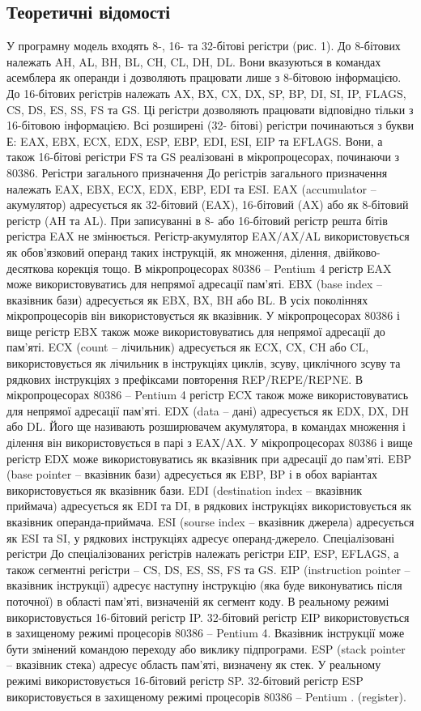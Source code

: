 \documentclass[12pt]{extarticle}
\begin{document}
\subsection*{Теоретичні відомості}
У програмну модель входять 8-, 16- та 32-бітові регістри (рис. 1). До 8-бітових
належать AH, AL, BH, BL, CH, CL, DH, DL. Вони вказуються в командах асемблера як
операнди і дозволяють працювати лише з 8-бітовою інформацією. До 16-бітових регістрів
належать AX, BX, CX, DX, SP, BP, DI, SI, IP, FLAGS, CS, DS, ES, SS, FS та GS. Ці регістри
дозволяють працювати відповідно тільки з 16-бітовою інформацією. Всі розширені (32-
бітові) регістри починаються з букви Е: EAX, EBX, ECX, EDX, ESP, EBP, EDI, ESI, EIP
та EFLAGS. Вони, а також 16-бітові регістри FS та GS реалізовані в мікропроцесорах,
починаючи з 80386.
Регістри загального призначення
До регістрів загального призначення належать EAX, EBX, ECX, EDX, EBP, EDI та
ESI.
EAX (accumulator – акумулятор) адресується як 32-бітовий (EAX), 16-бітовий
(AX) або як 8-бітовий регістр (AH та AL). При записуванні в 8- або 16-бітовий регістр
решта бітів регістра EAX не змінюється. Регістр-акумулятор EAX/AX/AL
використовується як обов’язковий операнд таких інструкцій, як множення, ділення,
двійково-десяткова корекція тощо. В мікропроцесорах 80386 – Pentium 4 регістр EAX
може використовуватись для непрямої адресації пам’яті.
EBX (base index – вказівник бази) адресується як EBX, BX, BH або BL. В усіх
поколіннях мікропроцесорів він використовується як вказівник. У мікропроцесорах 80386
і вище регістр EBX також може використовуватись для непрямої адресації до пам’яті.
ECX (count – лічильник) адресується як ECX, CX, CH або CL, використовується
як лічильник в інструкціях циклів, зсуву, циклічного зсуву та рядкових інструкціях з
префіксами повторення REP/REPE/REPNE. В мікропроцесорах 80386 – Pentium 4
регістр ECX також може використовуватись для непрямої адресації пам’яті.
EDX (data – дані) адресується як EDX, DX, DH або DL. Його ще називають
розширювачем акумулятора, в командах множення і ділення він використовується в
парі з EAX/AX. У мікропроцесорах 80386 і вище регістр EDX може використовуватись
як вказівник при адресації до пам’яті.
EBP (base pointer – вказівник бази) адресується як EBP, BP і в обох варіантах
використовується як вказівник бази.
EDI (destination index – вказівник приймача) адресується як EDI та DI, в рядкових
інструкціях використовується як вказівник операнда-приймача.
ESI (sourse index – вказівник джерела) адресується як ESI та SI, у рядкових
інструкціях адресує операнд-джерело.
Спеціалізовані регістри
До спеціалізованих регістрів належать регістри EIP, ESP, EFLAGS, а також
сегментні регістри – CS, DS, ES, SS, FS та GS.
EIP (instruction pointer – вказівник інструкції) адресує наступну інструкцію (яка
буде виконуватись після поточної) в області пам’яті, визначеній як сегмент коду. В
реальному режимі використовується 16-бітовий регістр IP. 32-бітовий регістр EIP
використовується в захищеному режимі процесорів 80386 – Pentium 4. Вказівник
інструкції може бути змінений командою переходу або виклику підпрограми.
ESP (stack pointer – вказівник стека) адресує область пам’яті, визначену як стек. У
реальному режимі використовується 16-бітовий регістр SP. 32-бітовий регістр ESP
використовується в захищеному режимі процесорів 80386 – Pentium .
(register).
\end{document}

